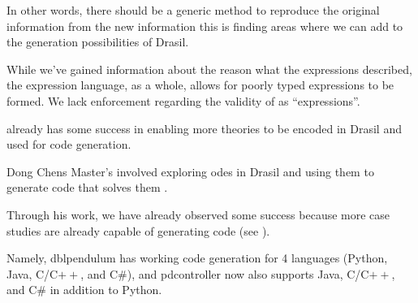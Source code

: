 In other words, there should be a generic method to reproduce the original
information from the new information \textemdash{} this is finding areas where
we can add to the generation possibilities of Drasil.




While we've gained information about the reason what the expressions described,
the expression language, as a whole, allows for poorly typed expressions to be
formed. We lack enforcement regarding the validity of \Expr{} as
``expressions''.




\ModelKind{} already has some success in enabling more theories to be encoded in
Drasil and used for code generation.

Dong Chens Master's involved exploring \acsp{ode} in Drasil and using them to
generate code that solves them \cite{Chen2022MEng}.

Through his work, we have already observed some success because more case
studies are already capable of generating code (see
).

Namely, \acs{dblpendulum} has working code generation for 4 languages (Python,
Java, C/C\(++\), and C\#), and \acs{pdcontroller} now also supports Java,
C/C\(++\), and C\# in addition to Python.

\caseStudiesCodeTableAfterDongsWork{}
